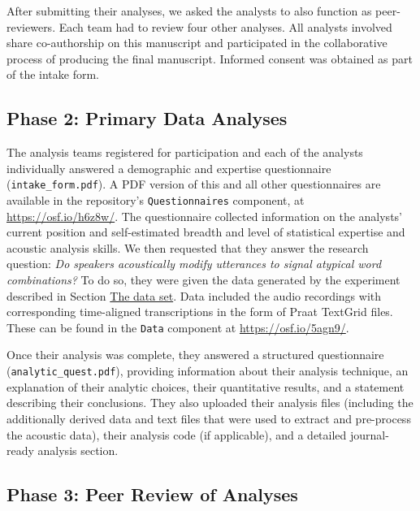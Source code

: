 \documentclass[Review,times,sageh]{sagej}
\begin{document}
After submitting their analyses, we asked the analysts to also function as peer-reviewers.
Each team had to review four other analyses.
All analysts involved share co-authorship on this manuscript and participated in the collaborative process of producing the final manuscript.
Informed consent was obtained as part of the intake form.

\hypertarget{phase-2-primary-data-analyses}{%
\subsection{Phase 2: Primary Data Analyses}\label{phase-2-primary-data-analyses}}

The analysis teams registered for participation and each of the analysts individually answered a demographic and expertise questionnaire (\texttt{intake\_form.pdf}).
A PDF version of this and all other questionnaires are available in the repository's \texttt{Questionnaires} component, at \url{https://osf.io/h6z8w/}.
The questionnaire collected information on the analysts' current position and self-estimated breadth and level of statistical expertise and acoustic analysis skills.
We then requested that they answer the research question: \emph{Do speakers acoustically modify utterances to signal atypical word combinations?}
To do so, they were given the data generated by the experiment described in Section \protect\hyperlink{s:dataset}{The data set}.
Data included the audio recordings with corresponding time-aligned transcriptions in the form of Praat TextGrid files.
These can be found in the \texttt{Data} component at \url{https://osf.io/5agn9/}.

Once their analysis was complete, they answered a structured questionnaire (\texttt{analytic\_quest.pdf}), providing information about their analysis technique, an explanation of their analytic choices, their quantitative results, and a statement describing their conclusions.
They also uploaded their analysis files (including the additionally derived data and text files that were used to extract and pre-process the acoustic data), their analysis code (if applicable), and a detailed journal-ready analysis section.

\hypertarget{phase-3-peer-review-of-analyses}{%
\subsection{Phase 3: Peer Review of Analyses}\label{phase-3-peer-review-of-analyses}}
\end{document}
